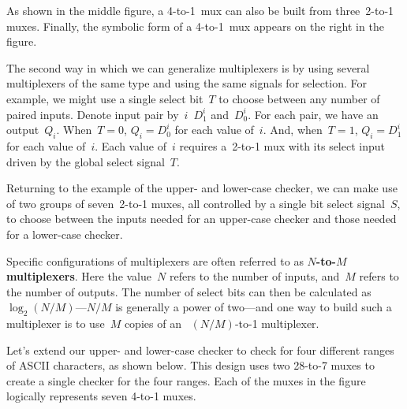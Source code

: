 \centerline{}

As shown in the middle figure, a \mbox{4-to-1}~mux can also be built from
three~\mbox{2-to-1} muxes.  Finally, the symbolic form of a \mbox{4-to-1}~mux 
appears on the right in the figure.

\pagebreak

The second way in which we can generalize multiplexers is by using
several multiplexers of the same type and using the same signals for 
selection.  For example, we might use a single select bit~$T$ to choose 
between any number of paired inputs.  Denote input pair by~$i$~$D_1^i$ 
and~$D_0^i$.  For each pair, we have an output~$Q_i$.  
%
When~$T=0$, $Q_i=D_0^i$ for each value of~$i$.
%
And, when~$T=1$, $Q_i=D_1^i$ for each value of~$i$.
%
Each value of~$i$ requires a~\mbox{2-to-1} mux with its select input
driven by the global select signal~$T$.

Returning to the example of the upper- and lower-case checker, we
can make use of two groups of seven~\mbox{2-to-1} muxes, all controlled by
a single bit select signal~$S$, to choose between the inputs needed
for an upper-case checker and those needed for a lower-case checker.

Specific configurations of multiplexers are often referred to
as {\bf $N$-to-$M$ multiplexers}.  Here the value~$N$ refers to the
number of inputs, and~$M$ refers to the number of outputs.  The
number of select bits can then be calculated as~$\log_2(N/M)$---$N/M$ 
is generally a power of two---and one way to build such a 
multiplexer is to use~$M$ copies of
an ~$(N/M)$-to-1 multiplexer.

Let's extend our upper- and lower-case checker to check
for four different ranges of ASCII characters, as shown below.
This design uses two \mbox{28-to-7} muxes to create a single
checker for the four ranges.  Each of the muxes in the figure logically 
represents seven \mbox{4-to-1} muxes.\\

\centerline{}\vspace{12pt}

